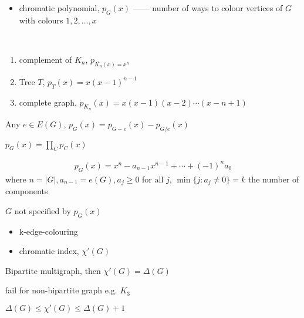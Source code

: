 \begin{itemize}
    \item chromatic polynomial, $p_G(x)$ ------ number of ways to colour vertices of $G$ with colours $1, 2, \dots, x$
\end{itemize}

\begin{example}
    \,
    \begin{enumerate}
        \item complement of $K_n$, $p_{\bar{K_n}(x) = x^n}$
        \item Tree $T$, $p_T(x) = x(x-1)^{n-1}$
        \item complete graph, $p_{K_n}(x) = x(x - 1)(x - 2)\cdots(x - n + 1)$
    \end{enumerate}
\end{example}

\begin{thm}
    Any $e \in E(G)$, $p_G(x) = p_{G-e}(x) - p_{G/e}(x)$
\end{thm}

\begin{fact}
    $p_G(x) = \prod_C p_C(x)$
\end{fact}

\begin{cor}
    \begin{align*}
        p_G(x) = x^n - a_{n-1} x^{n-1} + \cdots + (-1)^n a_0
    \end{align*}
    where $n = |G|, a_{n-1} = e(G), a_j \geq 0$ for all $j$, $\min\{j: a_j \neq 0\} = k$ the number of components
\end{cor}

\begin{fact}
    $G$ not specified by $p_G(x)$
\end{fact}

\begin{itemize}
    \item k-edge-colouring
    \item chromatic index, $\chi'(G)$
\end{itemize}

\begin{thm}
    Bipartite multigraph, then $\chi'(G) = \Delta(G)$
\end{thm}

\begin{fact}
    fail for non-bipartite graph e.g. $K_3$
\end{fact}

\begin{thm}[Vizing]
    $\Delta(G) \leq \chi'(G) \leq \Delta(G) + 1$
\end{thm}

